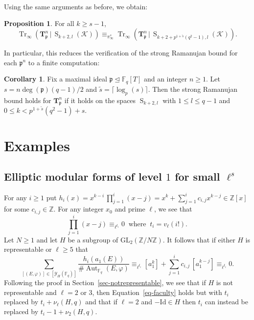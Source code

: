 \documentclass[10pt]{article}
\theoremstyle{definition}
\newtheorem{proposition}[theorem]{Proposition}
\newtheorem{corollary}[theorem]{Corollary}
\let\phi\varphi
\DeclareMathOperator\Aut{Aut}
\DeclareMathOperator\Tr{Tr}
\renewcommand{\:}{\colon}
\newcommand{\T}{\mathbf{T}}
\renewcommand{\S}{\operatorname{S}}
\newcommand{\bF}{\mathbb{F}}
\begin{document}
Using the same arguments as before, we obtain:

\begin{proposition} For all $k \geq s-1$, 
    \[
    \Tr_\infty(\T_{\mathfrak p}^n \, | \, \S_{k+2,l}(\mathcal K)) \equiv_{\pi_\infty^s} 
    \Tr_\infty(\T_{\mathfrak p}^n \, | \, \S_{k+2+p^{1+\tilde{s}}(q^2-1),l}(\mathcal K)).
    \]
\end{proposition} 

In particular, this reduces the verification of the strong Ramanujan bound for each $\mathfrak p^n$ to a finite computation:

\begin{corollary}
    Fix a maximal ideal $\mathfrak p \trianglelefteq \bF_q[T]$ and an integer $n \geq 1$. Let $s = n\deg(\mathfrak p)(q-1)/2$ and $\tilde{s} = \lceil \log_p(s)\rceil$. Then the strong Ramanujan bound holds for $\T_{\mathfrak p}^n$ if it holds on the spaces $\S_{k+2,l}$ with $1 \leq l \leq q-1$ and $0 \leq k < p^{1 + \tilde{s}}(q^2-1) + s$.
\end{corollary}

\section{Examples}\label{sec:examples}

\subsection{Elliptic modular forms of level $1$ for small $\ell^s$}
\label{seq-congruence}
For any $i \geq 1$ put $h_i(x)=x^{k-i} \, \prod_{j=1}^i(x-j)=x^k+\sum_{j=1}^i c_{i,j} x^{k-j} \in \mathbb Z[x]$ for some $c_{i,j} \in \mathbb Z$. For any integer $x_0$ and prime $\ell$, we see that 
\[
\prod_{j=1}^i (x-j) \equiv_{\ell^{t_i}} 0 \;\; \text{where} \;\; t_i= v_{\ell}(i!).
\]
Let $N\geq 1$ and let $H$ be a subgroup of $\mathrm{GL}_2(\mathbb Z/N\mathbb Z)$. It follows that if either $H$ is representable or $\ell \geq 5$ that 
\begin{equation} \label{eq-faculty}
\sum_{[(E,\phi)] \in [\mathcal{Y}_{H}(\bF_q)]} \frac{h_i(a_1(E))}{\# \Aut_{\bF_q}(E,\phi)}\equiv_{\ell^{t_i}} [a_1^k] +\sum_{j=1}^i c_{i,j} \, [a_1^{k-j}] \equiv_{\ell^{t_i}} 0.
\end{equation}
Following the proof in Section~\ref{sec-notrepresentable}, we see that if $H$ is not representable and $\ell=2$ or $3$, then Equation~\eqref{eq-faculty} holds but with $t_i$ replaced by $t_i+\nu_\ell(H,q)$ and that if $\ell=2$ and $-\mathrm{Id}\in H$ then $t_i$ can instead be replaced by $t_i-1+\nu_2(H,q)$.
\end{document}
